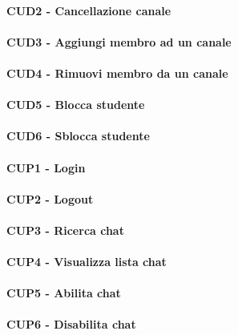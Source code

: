 \paragraph{CUD2 - Cancellazione canale\\}
\paragraph{CUD3 - Aggiungi membro ad un canale\\}
\paragraph{CUD4 - Rimuovi membro da un canale\\}
\paragraph{CUD5 - Blocca studente\\}
\paragraph{CUD6 - Sblocca studente\\}
\paragraph{CUP1 - Login \\}
\paragraph{CUP2 - Logout\\}
\paragraph{CUP3 - Ricerca chat\\}
\paragraph{CUP4 - Visualizza lista chat\\}
\paragraph{CUP5 - Abilita chat\\}
\paragraph{CUP6 - Disabilita chat\\}
